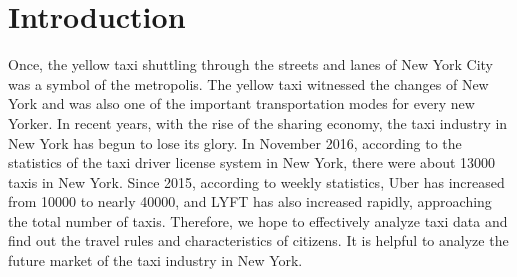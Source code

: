 \section{Introduction}\label{sec-intro}













Once, the yellow taxi shuttling through the streets and lanes of New York City was a symbol of the metropolis. The yellow taxi witnessed the changes of New York and was also one of the important transportation modes for every new Yorker. In recent years, with the rise of the sharing economy, the taxi industry in New York has begun to lose its glory. In November 2016, according to the statistics of the taxi driver license system in New York, there were about 13000 taxis in New York. Since 2015, according to weekly statistics, Uber has increased from 10000 to nearly 40000, and LYFT has also increased rapidly, approaching the total number of taxis. Therefore, we hope to effectively analyze taxi data and find out the travel rules and characteristics of citizens. It is helpful to analyze the future market of the taxi industry in New York.


